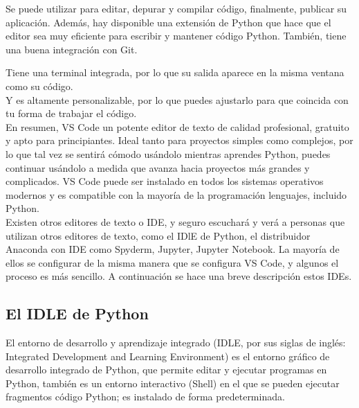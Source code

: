 Se puede utilizar para editar, depurar y compilar código, finalmente, publicar su aplicación.  Además, hay disponible una extensión de Python que hace que el editor sea muy eficiente  para escribir y mantener código Python.  También, tiene una buena integración con Git.






Tiene una terminal integrada, por lo que su salida aparece en la misma ventana como su código. \\



Y es altamente personalizable, por lo que puedes ajustarlo para que coincida con tu forma de trabajar el código.\\









En resumen, VS Code un potente editor de texto de calidad profesional, gratuito y apto para principiantes. Ideal tanto para proyectos  simples como complejos, por lo que tal vez se sentirá cómodo usándolo mientras aprendes Python, puedes continuar usándolo
a medida que avanza hacia proyectos más grandes y complicados.  VS Code puede ser instalado en todos los sistemas operativos modernos y es compatible con la mayoría de la programación lenguajes, incluido Python.\\



Existen otros editores de texto o IDE, y seguro escuchará y verá a personas que utilizan otros editores de texto, como el IDlE de Python, el distribuidor Anaconda con IDE como Spyderm, Jupyter, Jupyter Notebook. La mayoría de ellos se  configurar de la misma manera que se configura VS Code, y algunos el proceso es más sencillo. A continuación se hace una  breve descripción estos IDEs.\\






\subsection*{El IDLE de Python}

El entorno de desarrollo y aprendizaje integrado (IDLE, por sus siglas de inglés: Integrated Development and Learning Environment)  es el entorno gráfico de desarrollo integrado de Python, que permite editar y ejecutar programas en Python, también es un entorno interactivo (Shell) en el que se pueden ejecutar fragmentos código Python; es instalado de forma predeterminada. 


